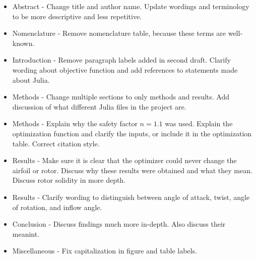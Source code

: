 \documentclass[journal ]{new-aiaa}
\begin{document}
\begin{itemize}
	\item Abstract - Change title and author name. Update wordings and terminology to be more descriptive and less repetitive.
	\item Nomenclature - Remove nomenclature table, because these terms are well-known.
	\item Introduction - Remove paragraph labels added in second draft. Clarify wording about objective function and add references to statements made about Julia.
	\item Methods - Change multiple sections to only methods and results. Add discussion of what different Julia files in the project are.
	\item Methods - Explain why the safety factor $n=1.1$ was used. Explain the optimization function and clarify the inputs, or include it in the optimization table. Correct citation style. 
	\item Results - Make sure it is clear that the optimizer could never change the airfoil or rotor. Discuss why these results were obtained and what they mean. Discuss rotor solidity in more depth.
	\item Results - Clarify wording to distinguish between angle of attack, twist, angle of rotation, and inflow angle.
	\item Conclusion - Discuss findings much more in-depth. Also discuss their meanint.
	\item Miscellaneous - Fix capitalization in figure and table labels.
\end{itemize}


\end{document}
